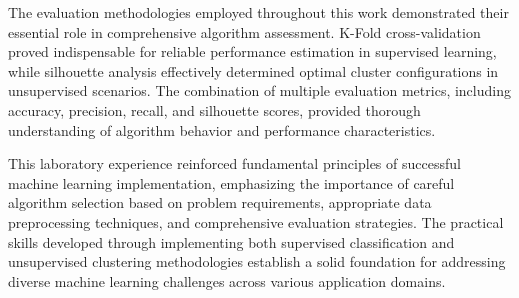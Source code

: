 \documentclass[12pt,a4paper]{article}
\begin{document}
The evaluation methodologies employed throughout this work demonstrated their essential role in comprehensive algorithm assessment. K-Fold cross-validation proved indispensable for reliable performance estimation in supervised learning, while silhouette analysis effectively determined optimal cluster configurations in unsupervised scenarios. The combination of multiple evaluation metrics, including accuracy, precision, recall, and silhouette scores, provided thorough understanding of algorithm behavior and performance characteristics.

This laboratory experience reinforced fundamental principles of successful machine learning implementation, emphasizing the importance of careful algorithm selection based on problem requirements, appropriate data preprocessing techniques, and comprehensive evaluation strategies. The practical skills developed through implementing both supervised classification and unsupervised clustering methodologies establish a solid foundation for addressing diverse machine learning challenges across various application domains.
\end{document}
